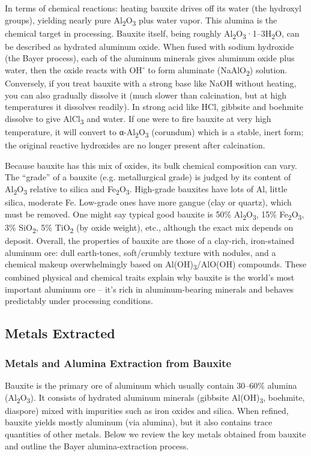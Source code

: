 \documentclass[12pt,a4paper, top=1.9cm, bottom=2.03cm, left=3.81cm, right=1.9cm]{article}
\begin{document}
\noindent\fontsize{12}{14}\selectfont In terms of chemical reactions: heating bauxite drives off its water (the hydroxyl groups), yielding nearly pure Al\textsubscript{2}O\textsubscript{3} plus water vapor. This alumina is the chemical target in processing. Bauxite itself, being roughly Al\textsubscript{2}O\textsubscript{3}·1–3H\textsubscript{2}O, can be described as hydrated aluminum oxide. When fused with sodium hydroxide (the Bayer process), each of the aluminum minerals gives aluminum oxide plus water, then the oxide reacts with OH⁻ to form aluminate (NaAlO\textsubscript{2}) solution. Conversely, if you treat bauxite with a strong base like NaOH without heating, you can also gradually dissolve it (much slower than calcination, but at high temperatures it dissolves readily). In strong acid like HCl, gibbsite and boehmite dissolve to give AlCl\textsubscript{3} and water. If one were to fire bauxite at very high temperature, it will convert to α-Al\textsubscript{2}O\textsubscript{3} (corundum) which is a stable, inert form; the original reactive hydroxides are no longer present after calcination.

\noindent\fontsize{12}{14}\selectfont Because bauxite has this mix of oxides, its bulk chemical composition can vary. The “grade” of a bauxite (e.g. metallurgical grade) is judged by its content of Al\textsubscript{2}O\textsubscript{3} relative to silica and Fe\textsubscript{2}O\textsubscript{3}. High-grade bauxites have lots of Al, little silica, moderate Fe. Low-grade ones have more gangue (clay or quartz), which must be removed. One might say typical good bauxite is 50\% Al\textsubscript{2}O\textsubscript{3}, 15\% Fe\textsubscript{2}O\textsubscript{3}, 3\% SiO\textsubscript{2}, 5\% TiO\textsubscript{2} (by oxide weight), etc., although the exact mix depends on deposit.
\noindent\fontsize{12}{14}\selectfont Overall, the properties of bauxite are those of a clay-rich, iron-stained aluminum ore: dull earth-tones, soft/crumbly texture with nodules, and a chemical makeup overwhelmingly based on Al(OH)\textsubscript{3}/AlO(OH) compounds. These combined physical and chemical traits explain why bauxite is the world’s most important aluminum ore – it’s rich in aluminum-bearing minerals and behaves predictably under processing conditions.
\subsection{Metals Extracted}
\subsubsection{Metals and Alumina Extraction from Bauxite}
\noindent\fontsize{12}{14}\selectfont Bauxite is the primary ore of aluminum which usually contain 30–60\% alumina (Al\textsubscript{2}O\textsubscript{3}). It consists of hydrated aluminum minerals (gibbsite Al(OH)\textsubscript{3}, boehmite, diaspore) mixed with impurities such as iron oxides and silica. When refined, bauxite yields mostly aluminum (via alumina), but it also contains trace quantities of other metals. Below we review the key metals obtained from bauxite and outline the Bayer alumina-extraction process.
\end{document}
